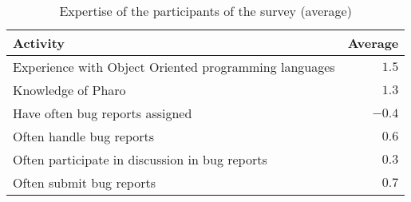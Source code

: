 \begin{table}[h]
\begin{center}
\caption{Expertise of the participants of the survey (average)}\label{tab:survey}
\begin{tabular}{lr}
\textbf{Activity} & \textbf{Average} \\
\hline
Experience with Object Oriented programming languages & $1.5$ \\
Knowledge of Pharo & $1.3$ \\ \hline
Have often bug reports assigned & $-0.4$ \\
Often handle bug reports & $0.6$ \\
Often participate in discussion in bug reports & $0.3$ \\
Often submit bug reports & $0.7$ \\
\hline
\end{tabular}
\label{tab:survey-expertise}
\end{center}
\end{table}



